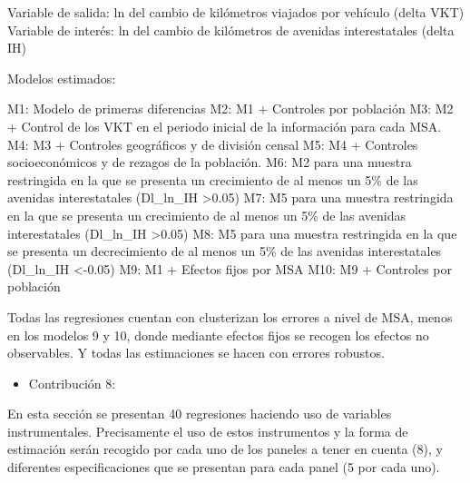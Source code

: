\documentclass[
]{article}
\providecommand{\tightlist}{%
  \setlength{\itemsep}{0pt}\setlength{\parskip}{0pt}}
\begin{document}
Variable de salida: ln del cambio de kilómetros viajados por vehículo
(delta VKT) Variable de interés: ln del cambio de kilómetros de avenidas
interestatales (delta IH)

Modelos estimados:

M1: Modelo de primeras diferencias M2: M1 + Controles por población M3:
M2 + Control de los VKT en el periodo inicial de la información para
cada MSA. M4: M3 + Controles geográficos y de división censal M5: M4 +
Controles socioeconómicos y de rezagos de la población. M6: M2 para una
muestra restringida en la que se presenta un crecimiento de al menos un
5\% de las avenidas interestatales (Dl\_ln\_IH \textgreater0.05) M7: M5
para una muestra restringida en la que se presenta un crecimiento de al
menos un 5\% de las avenidas interestatales (Dl\_ln\_IH
\textgreater0.05) M8: M5 para una muestra restringida en la que se
presenta un decrecimiento de al menos un 5\% de las avenidas
interestatales (Dl\_ln\_IH \textless-0.05) M9: M1 + Efectos fijos por
MSA M10: M9 + Controles por población

Todas las regresiones cuentan con clusterizan los errores a nivel de
MSA, menos en los modelos 9 y 10, donde mediante efectos fijos se
recogen los efectos no observables. Y todas las estimaciones se hacen
con errores robustos.

\begin{itemize}
\tightlist
\item
  Contribución 8:
\end{itemize}

En esta sección se presentan 40 regresiones haciendo uso de variables
instrumentales. Precisamente el uso de estos instrumentos y la forma de
estimación serán recogido por cada uno de los paneles a tener en cuenta
(8), y diferentes especificaciones que se presentan para cada panel (5
por cada uno).
\end{document}
